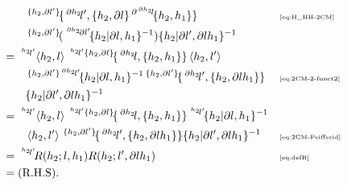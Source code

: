 \documentclass[11pt, reqno]{amsart} %
\newcommand{\act}[1]{\,\sp{#1}\!}
\theoremstyle{definition}
\theoremstyle{remark}
\numberwithin{equation}{section}
\begin{document}
\begin{align*}
  &\qquad 
  \act{\{h_2,\partial l'\}}\{\act{\partial h_2}l',\{h_2,\partial l\}\act{\partial \act{\partial h_2}l}\{h_2,h_1\}\} & &\text{\tiny \eqref{eq:H_HH-2CM}} \\
  &\qquad \act{\{h_2,\partial l'\}}(\act{\act{\partial h_2}\partial l'}\{h_2|\partial l,h_1\}^{-1})\{h_2|\partial l',\partial lh_1\}^{-1} \\
  &= 
  \act{\act{h_2}l'}\left<h_2,l\right>\act{\act{h_2}l'\{h_2,\partial l\}}\{\act{\partial h_2}l,\{h_2,h_1\}\}\left<h_2,l'\right> \\
  &\qquad 
  \act{\{h_2,\partial l'\}\act{\partial h_2}l'}\{h_2|\partial l,h_1\}^{-1}\act{\{h_2,\partial l'\}}\{\act{\partial h_2}l',\{h_2,\partial lh_1\}\} & &\text{\tiny \eqref{eq:2CM-2-funct2}} \\
  &\qquad \{h_2|\partial l',\partial lh_1\}^{-1} \\
  &= 
  \act{\act{h_2}l'}\left<h_2,l\right>\act{\act{h_2}l'\{h_2,\partial l\}}\{\act{\partial h_2}l,\{h_2,h_1\}\}\act{\act{h_2}l'}\{h_2|\partial l,h_1\}^{-1} \\
  &\qquad 
  \left<h_2,l'\right> \act{\{h_2,\partial l'\}}\{\act{\partial h_2}l',\{h_2,\partial lh_1\}\}\{h_2|\partial l',\partial lh_1\}^{-1} & &\text{\tiny \eqref{eq:2CM-Peifferid}} \\
  &= \act{\act{h_2}l'}R(h_2;l,h_1)R(h_2;l',\partial lh_1) & &\text{\tiny \eqref{eq:defR}} \\
  &= (\text{R.H.S}).
\end{align*}
\end{document}
